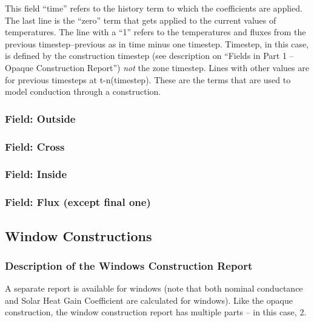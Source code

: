 This field ``time'' refers to the history term to which the coefficients are applied. The last line is the ``zero'' term that gets applied to the current values of temperatures. The line with a ``1'' refers to the temperatures and fluxes from the previous timestep--previous as in time minus one timestep. Timestep, in this case, is defined by the construction timestep (see description on ``Fields in Part 1 -- Opaque Construction Report'') \emph{not} the zone timestep. Lines with other values are for previous timesteps at t-n(timestep). These are the terms that are used to model conduction through a construction.

\subsubsection{Field: Outside}\label{field-outside}

\subsubsection{Field: Cross}\label{field-cross}

\subsubsection{Field: Inside}\label{field-inside}

\subsubsection{Field: Flux (except final one)}\label{field-flux-except-final-one}

\subsection{Window Constructions}\label{window-constructions}

\subsubsection{Description of the Windows Construction Report}\label{description-of-the-windows-construction-report}

A separate report is available for windows (note that both nominal conductance and Solar Heat Gain Coefficient are calculated for windows). Like the opaque construction, the window construction report has multiple parts -- in this case, 2.

